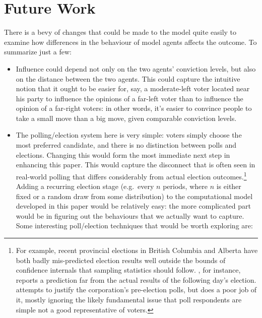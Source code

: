 \documentclass[12pt]{article}
\numberwithin{equation}{subsection}
\begin{document}
\section{Future Work}

There is a bevy of changes that could be made to the model quite easily to examine how differences
in the behaviour of model agents affects the outcome.  To summarize just a few:

\begin{itemize}
    \item
        Influence could depend not only on the two agents' conviction levels, but also on the
        distance between the two agents.  This could capture the intuitive notion that it ought to
        be easier for, say, a moderate-left voter located near his party to influence the opinions
        of a far-left voter than to influence the opinion of a far-right voters: in other words,
        it's easier to convince people to take a small move than a big move, given comparable
        conviction levels.
    \item
        The polling/election system here is very simple: voters simply choose the most preferred candidate,
        and there is no distinction between polls and elections.  Changing this would form the most
        immediate next step in enhancing this paper.  This would capture the disconnect that is
        often seen in real-world polling that differs considerably from actual election
        outcomes.\footnote{
            For example, recent provincial elections in British Columbia and Alberta have both badly
            mis-predicted election results well outside the bounds of confidence internals that
            sampling statistics should follow.  \citet{ipsos:prebc}, for instance, reports a
            prediction far from the actual results of the following day's election.
            \citet{ipsos:postbc} attempts to justify the corporation's pre-election polls, but does a poor job of
            it, mostly ignoring the likely fundamental issue that poll respondents are simple not a
        good representative of voters.}  Adding a recurring election stage (e.g.\ every $n$ periods,
        where $n$ is either fixed or a random draw from some distribution) to the computational model developed in this
        paper would be relatively easy: the more complicated part would be in figuring out the
        behaviours that we actually want to capture.  Some interesting poll/election techniques that would be
        worth exploring are:
        \begin{itemize}

\end{itemize}
\end{itemize}
\end{document}
